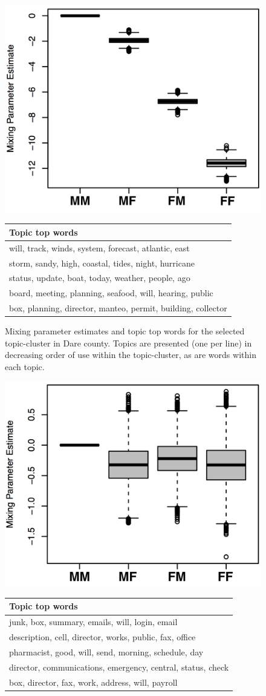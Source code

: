\documentclass{pnastwo}
\begin{document}
\begin{article}
\begin{figure}
	\centering
	\includegraphics[width = .37\textwidth]{./images/Dare_3_MP.png}
	\begin{tabular}{m{}}
	\toprule
	Topic top words\\
	\midrule
	will, track, winds, system, forecast, atlantic, east\\ 
	storm, sandy, high, coastal, tides, night, hurricane\\ 
	status, update, boat, today, weather, people, ago\\ 
	board, meeting, planning, seafood, will, hearing, public\\ 
	box, planning, director, manteo, permit, building, collector\\ 
	\bottomrule

	\end{tabular}
	\caption{\label{tab: dare 3 mp} Mixing parameter estimates and topic top words for the selected topic-cluster in Dare county. Topics are presented (one per line) in decreasing order of use within the topic-cluster, as are words within each topic.}
\end{figure}



\begin{figure}
	\centering
	\includegraphics[width = .37\textwidth]{./images/Hoke_3_MP.png}
	\begin{tabular}{m{}}
	\toprule
	Topic top words\\
	\midrule
	junk, box, summary, emails, will, login, email\\ 
	description, cell, director, works, public, fax,  office\\ 
	pharmacist, good, will, send, morning, schedule, day\\ 
	director, communications, emergency, central, status, check\\ 
	box, director, fax, work, address, will, payroll\\ 
	\bottomrule


\end{tabular}
\end{figure}
\end{article}
\end{document}
